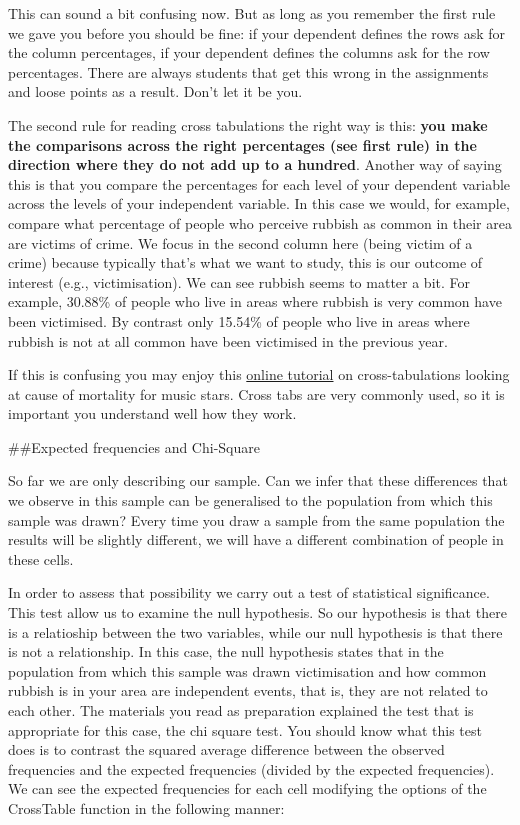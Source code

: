 \documentclass[]{book}
\theoremstyle{definition}
\theoremstyle{definition}
\theoremstyle{definition}
\theoremstyle{remark}
\begin{document}
This can sound a bit confusing now. But as long as you remember the
first rule we gave you before you should be fine: if your dependent
defines the rows ask for the column percentages, if your dependent
defines the columns ask for the row percentages. There are always
students that get this wrong in the assignments and loose points as a
result. Don't let it be you.

The second rule for reading cross tabulations the right way is this:
\textbf{you make the comparisons across the right percentages (see first
rule) in the direction where they do not add up to a hundred}. Another
way of saying this is that you compare the percentages for each level of
your dependent variable across the levels of your independent variable.
In this case we would, for example, compare what percentage of people
who perceive rubbish as common in their area are victims of crime. We
focus in the second column here (being victim of a crime) because
typically that's what we want to study, this is our outcome of interest
(e.g., victimisation). We can see rubbish seems to matter a bit. For
example, 30.88\% of people who live in areas where rubbish is very
common have been victimised. By contrast only 15.54\% of people who live
in areas where rubbish is not at all common have been victimised in the
previous year.

If this is confusing you may enjoy this
\href{http://sonet.nottingham.ac.uk/rlos/ucel/cross_tab_data/main.html}{online
tutorial} on cross-tabulations looking at cause of mortality for music
stars. Cross tabs are very commonly used, so it is important you
understand well how they work.

\#\#Expected frequencies and Chi-Square

So far we are only describing our sample. Can we infer that these
differences that we observe in this sample can be generalised to the
population from which this sample was drawn? Every time you draw a
sample from the same population the results will be slightly different,
we will have a different combination of people in these cells.

In order to assess that possibility we carry out a test of statistical
significance. This test allow us to examine the null hypothesis. So our
hypothesis is that there is a relatioship between the two variables,
while our null hypothesis is that there is not a relationship. In this
case, the null hypothesis states that in the population from which this
sample was drawn victimisation and how common rubbish is in your area
are independent events, that is, they are not related to each other. The
materials you read as preparation explained the test that is appropriate
for this case, the chi square test. You should know what this test does
is to contrast the squared average difference between the observed
frequencies and the expected frequencies (divided by the expected
frequencies). We can see the expected frequencies for each cell
modifying the options of the CrossTable function in the following
manner:
\end{document}
